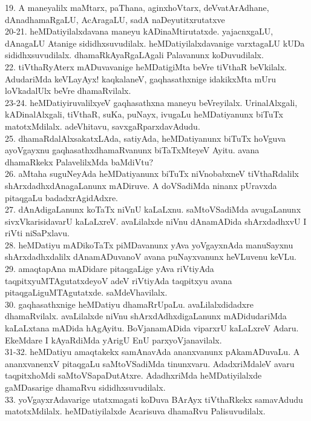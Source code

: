 \documentclass{article}
\begin{document}
19. A maneyalilx maMtarx, paThana, aginxhoVtarx, deVvatArAdhane, dAnadhamaRgaLU, AcAragaLU, sadA naDeyutitxrutatxve\\
20-21. heMDatiyilalxdavana maneyu kADinaMtirutatxde. yajacnxgaLU, dAnagaLU Atanige sididhxsuvudilalx. heMDatiyilalxdavanige varxtagaLU kUDa sididhxsuvudilalx. dhamaRkAyaRgaLAgali Palavanunx koDuvudilalx.\\
22. tiVthaRyAterx mADuvavanige heMDatigiMta beVre tiVthaR beVkilalx. AdudariMda keVLayAyx! kaqkalaneV, gaqhasathxnige idakikxMta mUru loVkadalUlx beVre dhamaRvilalx.\\
23-24. heMDatiyiruvalilxyeV gaqhasathxna maneyu beVreyilalx. UrinalAlxgali, kADinalAlxgali, tiVthaR, suKa, puNayx, ivugaLu heMDatiyanunx biTuTx matotxMdilalx. adeVhitavu, savxgaRparxdavAdudu.\\
25. dhamaRdalAlxsakatxLAda, satiyAda, heMDatiyanunx biTuTx hoVguva ayoVgayxnu gaqhasathxdhamaRvanunx biTaTxMteyeV Ayitu. avana dhamaRkekx PalavelilxMda baMdiVtu?\\
26. aMtaha suguNeyAda heMDatiyanunx biTuTx niVnobabxneV tiVthaRdalilx shArxdadhxdAnagaLanunx mADiruve. A doVSadiMda ninanx pUravxda pitaqgaLu badadxrAgidAdxre.\\
27. dAnAdigaLanunx koTaTx niVnU kaLaLxnu. saMtoVSadiMda avugaLanunx sivxVkarisidavarU kaLaLxreV. avaLilalxde niVnu dAnamADida shArxdadhxvU I riVti niSaPxlavu.\\
28. heMDatiyu mADikoTaTx piMDavanunx yAva yoVgayxnAda manuSayxnu shArxdadhxdalilx dAnamADuvanoV avana puNayxvanunx heVLuvenu keVLu.\\
29. amaqtapAna mADidare pitaqgaLige yAva riVtiyAda taqpitxyuMTAgutatxdeyoV adeV riVtiyAda taqpitxyu avana pitaqgaLiguMTAgutatxde. saMdeVhavilalx.\\
30. gaqhasathxnige heMDatiyu dhamaRrUpaLu. avaLilalxdidadxre dhamaRvilalx. avaLilalxde niVnu shArxdAdhxdigaLanunx mADidudariMda kaLaLxtana mADida hAgAyitu. BoVjanamADida viparxrU kaLaLxreV Adaru. EkeMdare I kAyaRdiMda yArigU EnU parxyoVjanavilalx.\\
31-32. heMDatiyu amaqtakekx samAnavAda ananxvanunx pAkamADuvaLu. A ananxvanenxV pitaqgaLu saMtoVSadiMda tinunxvaru. AdadxriMdaleV avaru taqpitxhoMdi saMtoVSapaDutAtxre. AdadhxriMda heMDatiyilalxde gaMDasarige dhamaRvu sididhxsuvudilalx.\\
33. yoVgayxrAdavarige utatxmagati koDuva BArAyx tiVthaRkekx samavAdudu matotxMdilalx. heMDatiyilalxde Acarisuva dhamaRvu Palisuvudilalx.\\
\end{document}
